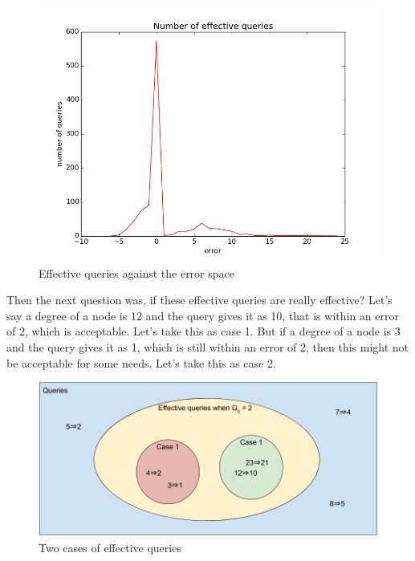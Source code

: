 \documentclass[12pt]{report}
\numberwithin{figure}{section}
\numberwithin{table}{section}
\begin{document}
\begin{figure}[H]
\centering
\includegraphics[scale=0.6]{images/deviation-plot-AS-2init-2scale-0t-n1000-e10000-sketches-811-821-823-827-829-839plot}
\caption{ Effective queries against the error space }
\end{figure}

Then the next question was, if these effective queries are really effective? Let's say a degree of a node is 12 and the query gives it as 10, that is within an error of 2, which is acceptable. Let's take this as case 1. But if a degree of a node is 3 and the query gives it as 1, which is still within an error of 2, then this might not be acceptable for some needs. Let's take this as case 2.

\begin{figure}[H]
\centering
\includegraphics[scale=0.4]{images/Effective-queries-when-G-is-2}
\caption{Two cases of effective queries}
\end{figure}

\paragraph{}
\end{document}
